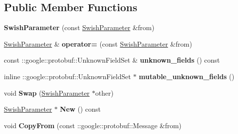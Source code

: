 \subsection*{Public Member Functions}
\begin{DoxyCompactItemize}
\item 
\mbox{\label{classcaffe_1_1_swish_parameter_a414524eb1952a15952235026940faf90}} 
{\bfseries Swish\+Parameter} (const \mbox{\hyperlink{classcaffe_1_1_swish_parameter}{Swish\+Parameter}} \&from)
\item 
\mbox{\label{classcaffe_1_1_swish_parameter_a3e0e998dabe0159213c508939abb140e}} 
\mbox{\hyperlink{classcaffe_1_1_swish_parameter}{Swish\+Parameter}} \& {\bfseries operator=} (const \mbox{\hyperlink{classcaffe_1_1_swish_parameter}{Swish\+Parameter}} \&from)
\item 
\mbox{\label{classcaffe_1_1_swish_parameter_a47c4c4ea0861d0933cf99080b140edb9}} 
const \+::google\+::protobuf\+::\+Unknown\+Field\+Set \& {\bfseries unknown\+\_\+fields} () const
\item 
\mbox{\label{classcaffe_1_1_swish_parameter_a2bf60e5e74516ca58c290c15c49b6103}} 
inline \+::google\+::protobuf\+::\+Unknown\+Field\+Set $\ast$ {\bfseries mutable\+\_\+unknown\+\_\+fields} ()
\item 
\mbox{\label{classcaffe_1_1_swish_parameter_ac4c14a9df7f317c169ba7103f61233ba}} 
void {\bfseries Swap} (\mbox{\hyperlink{classcaffe_1_1_swish_parameter}{Swish\+Parameter}} $\ast$other)
\item 
\mbox{\label{classcaffe_1_1_swish_parameter_a1027257f318980ce44b99860df0a7a34}} 
\mbox{\hyperlink{classcaffe_1_1_swish_parameter}{Swish\+Parameter}} $\ast$ {\bfseries New} () const
\item 
\mbox{\label{classcaffe_1_1_swish_parameter_a8b3c58372afd84b308a137e3b2041f84}} 
void {\bfseries Copy\+From} (const \+::google\+::protobuf\+::\+Message \&from)
\item 
\mbox{\label{classcaffe_1_1_swish_parameter_a3878f1880fc201a190f1e033bac6841a}} 

\end{DoxyCompactItemize}
